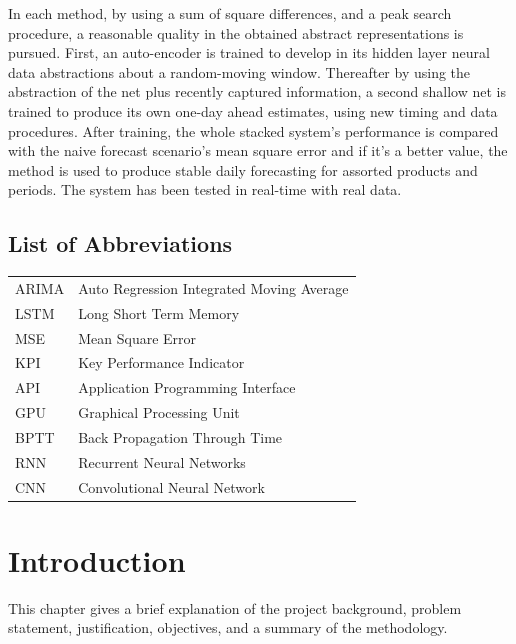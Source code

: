 \documentclass[12pt]{report}
\begin{document}
\indent In each method, by using a sum of square differences, and a peak search procedure, a reasonable quality in the obtained abstract representations is pursued. First, an auto-encoder is trained to develop in its hidden layer neural data abstractions about a random-moving window. Thereafter by using the abstraction of the net plus recently captured information, a second shallow net is trained to produce its own one-day ahead estimates, using new timing and data procedures. After training, the whole stacked system’s performance is compared with the naive forecast scenario’s mean square error and if it's a better value, the method is used to produce stable daily forecasting for assorted products and periods. The system has been tested in real-time with real data.

\newpage

\tableofcontents

\newpage

\listoffigures

\newpage

\listoftables

\newpage



\section*{List of Abbreviations}

\begin{tabular}{p{3cm} l}
	ARIMA	& Auto Regression Integrated Moving Average\\
	LSTM	& Long Short Term Memory\\	
  MSE & Mean Square Error\\
  KPI & Key Performance Indicator\\
  API & Application Programming Interface\\
  GPU & Graphical Processing Unit\\
  BPTT & Back Propagation Through Time\\
  RNN & Recurrent Neural Networks\\
  CNN & Convolutional Neural Network

\end{tabular}


\newpage
{}


\chapter{Introduction}
This chapter gives a brief explanation of the project background, problem statement,
justification, objectives, and a summary of the methodology.
\end{document}
